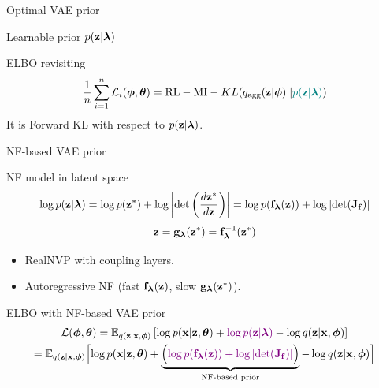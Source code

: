 \begin{frame}{Optimal VAE prior}
\begin{minipage}[t]{0.5\columnwidth}
\begin{block}{Learnable prior $p(\mathbf{z} | \boldsymbol{\lambda})$}
\begin{figure}[h]
			\end{figure}
		\end{block}
	\end{minipage}
	\vspace{-0.4cm}
	\begin{block}{ELBO revisiting}
		\vspace{-0.3cm}
		\[
			\frac{1}{n}\sum_{i=1}^n \mathcal{L}_i(\boldsymbol{\phi}, \boldsymbol{\theta}) = \text{RL} - \text{MI} -  KL(q_{\text{agg}}(\mathbf{z} | \boldsymbol{\phi}) || {\color{teal}p(\mathbf{z} | \boldsymbol{\lambda})})
		\]
		It is Forward KL with respect to $p(\mathbf{z} | \boldsymbol{\lambda})$.
	\end{block}
\end{frame}
\begin{frame}{NF-based VAE prior}
	\begin{block}{NF model in latent space}
		\vspace{-0.5cm}
		\[
			\log p(\mathbf{z} | \boldsymbol{\lambda}) = \log p(\mathbf{z}^*) + \log  \left | \det \left(\frac{d \mathbf{z}^*}{d\mathbf{z}}\right)\right| = \log p(\mathbf{f}_{\boldsymbol{\lambda}}(\mathbf{z})) + \log \left | \det (\mathbf{J}_{\mathbf{f}})\right| 
		\]
		\vspace{-0.3cm}
		\[
			\mathbf{z} = \mathbf{g}_{\boldsymbol{\lambda}}(\mathbf{z}^*) = \mathbf{f}^{-1}_{\boldsymbol{\lambda}}(\mathbf{z}^*)
		\]
	\end{block}
	\vspace{-0.3cm}
	\begin{itemize}
		\item RealNVP with coupling layers.
		\item Autoregressive NF (fast $\mathbf{f}_{\boldsymbol{\lambda}}(\mathbf{z})$, slow $\mathbf{g}_{\boldsymbol{\lambda}}(\mathbf{z}^*)$).
	\end{itemize}
	\begin{block}{ELBO with NF-based VAE prior}
		\vspace{-0.5cm}
		{\small
		\begin{multline*}
			\mathcal{L}(\boldsymbol{\phi}, \boldsymbol{\theta}) = \mathbb{E}_{q(\mathbf{z} | \mathbf{x}, \boldsymbol{\phi})} \left[ \log p(\mathbf{x} | \mathbf{z}, \boldsymbol{\theta}) + {\color{violet}\log p(\mathbf{z} | \boldsymbol{\lambda})} - \log q(\mathbf{z} | \mathbf{x}, \boldsymbol{\phi}) \right] \\
				= \mathbb{E}_{q(\mathbf{z} | \mathbf{x}, \boldsymbol{\phi})} \Bigl[ \log p(\mathbf{x} | \mathbf{z}, \boldsymbol{\theta}) + \underbrace{ \Bigl({\color{violet} \log p(\mathbf{f}_{\boldsymbol{\lambda}}(\mathbf{z})) + \log \left| \det (\mathbf{J}_{\mathbf{f}}) \right|} \Bigr) }_{\text{NF-based prior}} - \log q(\mathbf{z} | \mathbf{x}, \boldsymbol{\phi}) \Bigr] 
		\end{multline*}
		}
	\end{block}
\end{frame}
